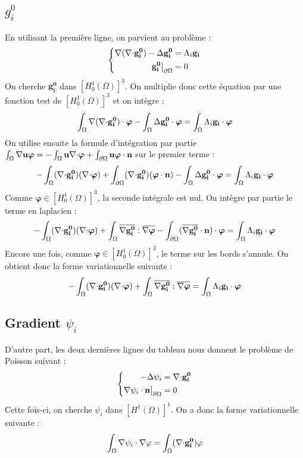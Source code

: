 \subsection{$g_i^0$}
En utilisant la première ligne, on parvient au problème :
\begin{equation}\label{gi0}
\left\{\begin{aligned}
{\nabla}({\nabla\cdot} \mathbf{g_i^0})-{\Delta} \mathbf{g_i^0} &= \Lambda_i\mathbf{g_i}\\
\mathbf{g_i^0}{\big\rvert_{\partial\Omega}} &= 0
\end{aligned}\right.
\end{equation}
On cherche $\mathbf{g_i^0}$ dans $[H^1_0(\Omega)]^3$. On multiplie donc cette équation par une fonction test de $[H^1_0(\Omega)]^3$ et on intègre :
\[ \int_\Omega {\nabla}({\nabla\cdot} \mathbf{g_i^0})\cdot\bm{\varphi} - \int_\Omega {\Delta} \mathbf{g_i^0}\cdot\bm{\varphi} = \int_\Omega \Lambda_i\mathbf{g_i}\cdot\bm{\varphi} \]
On utilise ensuite la formule d'intégration par partie $\int_\Omega {\nabla}{\mathbf{u}}\bm{\varphi} = -\int_\Omega \mathbf{u}{\nabla\cdot}\bm{\varphi} + \int_{\partial\Omega} \mathbf{u}\bm{\varphi}\cdot \mathbf{n}$ sur le premier terme :
\[ -\int_\Omega ({\nabla\cdot} \mathbf{g_i^0})({\nabla\cdot}\bm{\varphi}) + \int_{\partial\Omega} ({\nabla\cdot} \mathbf{g_i^0})(\bm{\varphi}\cdot \mathbf{n}) - \int_\Omega {\Delta} \mathbf{g_i^0}\cdot\bm{\varphi} = \int_\Omega \Lambda_i\mathbf{g_i}\cdot\bm{\varphi} \]
Comme $\bm{\varphi}\in [H^1_0(\Omega)]^3$, la seconde intégrale est nul. On intègre par partie le terme en laplacien :
\[ -\int_\Omega ({\nabla\cdot} \mathbf{g_i^0})({\nabla\cdot}\bm{\varphi}) + \int_\Omega \overline{{\nabla} \mathbf{g_i^0}}:\overline{{\nabla}\bm{\varphi}} - \int_{\partial\Omega} (\overline{{\nabla} \mathbf{g_i^0}}\cdot \mathbf{n})\cdot\bm{\varphi} = \int_\Omega \Lambda_i\mathbf{g_i}\cdot\bm{\varphi} \]
Encore une fois, comme $\bm{\varphi}\in [H^1_0(\Omega)]^3$, le terme sur les bords s'annule. On obtient donc la forme variationnelle suivante :
\begin{equation}\label{fvgi0}
-\int_\Omega ({\nabla\cdot} \mathbf{g_i^0})({\nabla\cdot}\bm{\varphi}) + \int_\Omega \overline{{\nabla} \mathbf{g_i^0}}:\overline{{\nabla}\bm{\varphi}} = \int_\Omega \Lambda_i\mathbf{g_i}\cdot\bm{\varphi}
\end{equation}

\subsection{Gradient $\psi_i$}
\label{multLagrange}

D'autre part, les deux dernières lignes du tableau nous donnent le problème de Poisson suivant :
\begin{equation}\label{psi}
\left\{\begin{aligned}
-{\Delta}\psi_i &= {\nabla\cdot} \mathbf{g_i^0}\\
{\nabla}\psi_i\cdot \mathbf{n}{\big\rvert_{\partial\Omega}} &= 0
\end{aligned}\right.
\end{equation}
Cette fois-ci, on cherche $\psi_i$ dans $[H^1(\Omega)]^1$. On a donc la forme variationnelle suivante :
\begin{equation}\label{fvpsi}
\int_\Omega {\nabla}\psi_i\cdot{\nabla}\varphi = \int_\Omega ({\nabla\cdot} \mathbf{g_i^0})\varphi
\end{equation}

